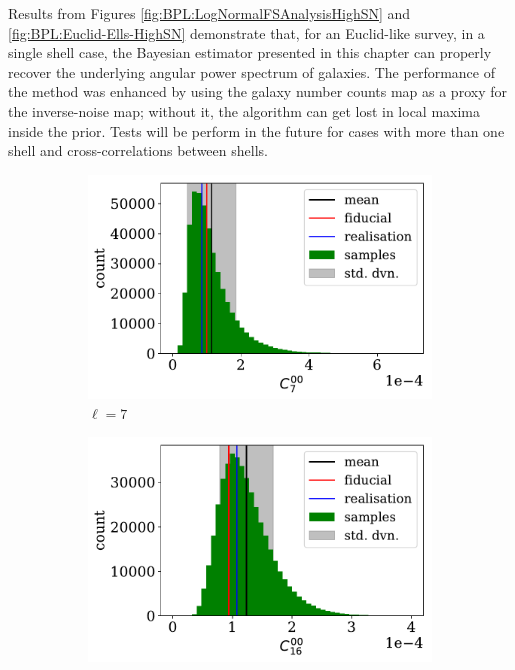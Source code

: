 \qquad Results from Figures \ref{fig:BPL:LogNormalFSAnalysisHighSN} and \ref{fig:BPL:Euclid-Ells-HighSN} demonstrate that, for an Euclid-like survey, in a single shell case, the Bayesian estimator presented in this chapter can properly recover the underlying angular power spectrum of galaxies. The performance of the method was enhanced by using the galaxy number counts map as a proxy for the inverse-noise map; without it, the algorithm can get lost in local maxima inside the prior. Tests will be perform in the future for cases with more than one shell and cross-correlations between shells.


\begin{figure}
\begin{subfigure}{.5\textwidth}
  \centering
  \includegraphics[width=\textwidth]{BPL-FIGS/Euclid-LN-PNoi-N32-HDens_HISTOGRAM-ell-07.pdf}
  \caption{$\ell = 7$}
\end{subfigure}
\begin{subfigure}{.5\textwidth}
  \centering
  \includegraphics[width=\textwidth]{BPL-FIGS/Euclid-LN-PNoi-N32-HDens_HISTOGRAM-ell-16.pdf}

\end{subfigure}
\end{figure}
